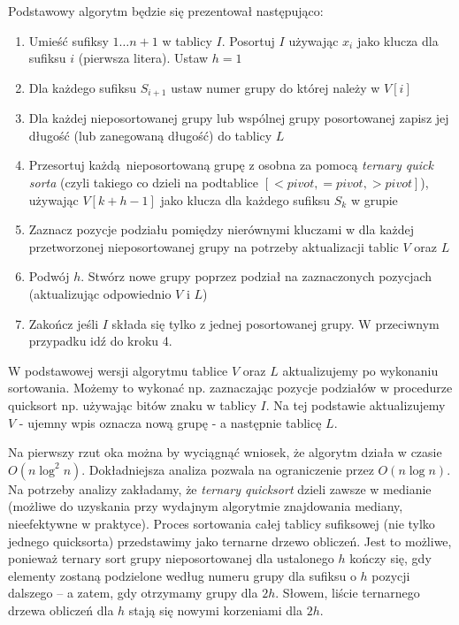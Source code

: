 \documentclass[12pt]{article}
\begin{document}
Podstawowy algorytm będzie się prezentował następująco:
\begin{enumerate}
    \item Umieść sufiksy $1 \ldots n+1$ w tablicy $I$. Posortuj $I$ używając $x_i$ jako klucza dla sufiksu $i$ (pierwsza litera). Ustaw $h=1$
    \item Dla każdego sufiksu $S_{i+1}$ ustaw numer grupy do której należy w $V[i]$
    \item Dla każdej nieposortowanej grupy lub wspólnej grupy posortowanej zapisz jej długość (lub zanegowaną długość) do tablicy $L$
    \item Przesortuj każdą nieposortowaną grupę z osobna za pomocą \textit{ternary quick sorta} (czyli takiego co dzieli na podtablice $[< \textit{pivot}, = \textit{pivot}, > \textit{pivot}]$), używając $V[k + h - 1]$ jako klucza dla każdego sufiksu $S_k$ w grupie
    \item Zaznacz pozycje podziału pomiędzy nierównymi kluczami w dla każdej przetworzonej nieposortowanej grupy na potrzeby aktualizacji tablic $V$ oraz $L$
    \item Podwój $h$. Stwórz nowe grupy poprzez podział na zaznaczonych pozycjach (aktualizując odpowiednio $V$ i $L$)
    \item Zakończ jeśli $I$ składa się tylko z jednej posortowanej grupy. W przeciwnym przypadku idź do kroku 4.
\end{enumerate}

W podstawowej wersji algorytmu tablice $V$ oraz $L$ aktualizujemy po wykonaniu sortowania. Możemy to wykonać np. zaznaczając pozycje podziałów w procedurze quicksort np. używając bitów znaku w tablicy $I$. Na tej podstawie aktualizujemy $V$ - ujemny wpis oznacza nową grupę - a następnie tablicę $L$.

Na pierwszy rzut oka można by wyciągnąć wniosek, że algorytm działa w czasie $O(n \log^2{n})$. Dokładniejsza analiza pozwala na ograniczenie przez $O(n \log{n})$. Na potrzeby analizy zakładamy, że \textit{ternary quicksort} dzieli zawsze w medianie (możliwe do uzyskania przy wydajnym algorytmie znajdowania mediany, nieefektywne w praktyce). Proces sortowania całej tablicy sufiksowej (nie tylko jednego quicksorta) przedstawimy jako ternarne drzewo obliczeń. Jest to możliwe, ponieważ ternary sort grupy nieposortowanej dla ustalonego $h$ kończy się, gdy elementy zostaną podzielone według numeru grupy dla sufiksu o $h$ pozycji dalszego -- a zatem, gdy otrzymamy grupy dla $2 h$. Słowem, liście ternarnego drzewa obliczeń dla $h$ stają się nowymi korzeniami dla $2 h$.
\end{document}
